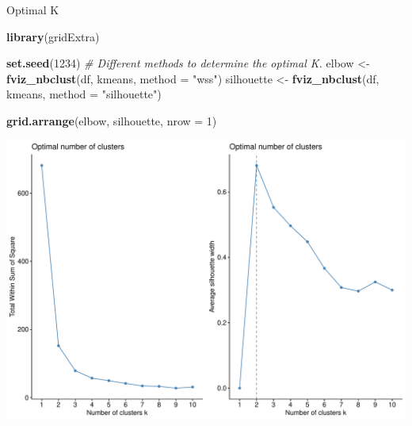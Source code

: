 \documentclass[12pt,ignorenonframetext,]{beamer}
\newenvironment{Shaded}{\begin{snugshade}}{\end{snugshade}}
\newcommand{\CommentTok}[1]{\textcolor[rgb]{0.56,0.35,0.01}{\textit{#1}}}
\newcommand{\DataTypeTok}[1]{\textcolor[rgb]{0.13,0.29,0.53}{#1}}
\newcommand{\DecValTok}[1]{\textcolor[rgb]{0.00,0.00,0.81}{#1}}
\newcommand{\KeywordTok}[1]{\textcolor[rgb]{0.13,0.29,0.53}{\textbf{#1}}}
\newcommand{\NormalTok}[1]{#1}
\newcommand{\StringTok}[1]{\textcolor[rgb]{0.31,0.60,0.02}{#1}}
\begin{document}
\begin{frame}[fragile]{Optimal K}
\protect\hypertarget{optimal-k}{}

\tiny

\begin{Shaded}
\begin{Highlighting}[]
\KeywordTok{library}\NormalTok{(gridExtra)}

\KeywordTok{set.seed}\NormalTok{(}\DecValTok{1234}\NormalTok{)}
\CommentTok{# Different methods to determine the optimal K.}
\NormalTok{elbow <-}\StringTok{ }\KeywordTok{fviz_nbclust}\NormalTok{(df, kmeans, }\DataTypeTok{method =} \StringTok{"wss"}\NormalTok{)}
\NormalTok{silhouette <-}\StringTok{ }\KeywordTok{fviz_nbclust}\NormalTok{(df, kmeans, }\DataTypeTok{method =} \StringTok{"silhouette"}\NormalTok{)}

\KeywordTok{grid.arrange}\NormalTok{(elbow, silhouette, }\DataTypeTok{nrow =} \DecValTok{1}\NormalTok{)}
\end{Highlighting}
\end{Shaded}

\begin{center}\includegraphics[width=0.7\linewidth,height=0.6\textheight]{figs/unnamed-chunk-17} \end{center}

\normalsize

\end{frame}
\end{document}
